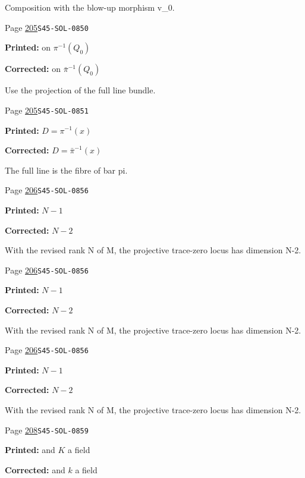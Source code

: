 \begin{description}
\par\noindent Composition with the blow-up morphism v\_0.
\smallskip
\item[\hypertarget{apparatus:EN-0145}{145}] Page \hyperlink{printpage:en:205}{205}\quad\texttt{S45-SOL-0850}
\par\noindent\textbf{Printed:} on $\pi^{-1}(Q_0)$
\par\noindent\textbf{Corrected:} on $\bar\pi^{-1}(Q_0)$
\par\noindent Use the projection of the full line bundle.
\smallskip
\item[\hypertarget{apparatus:EN-0146}{146}] Page \hyperlink{printpage:en:205}{205}\quad\texttt{S45-SOL-0851}
\par\noindent\textbf{Printed:} $D=\pi^{-1}(x)$
\par\noindent\textbf{Corrected:} $D=\bar\pi^{-1}(x)$
\par\noindent The full line is the fibre of bar pi.
\smallskip
\item[\hypertarget{apparatus:EN-0147}{147}] Page \hyperlink{printpage:en:206}{206}\quad\texttt{S45-SOL-0856}
\par\noindent\textbf{Printed:} \(N-1\)
\par\noindent\textbf{Corrected:} \(N-2\)
\par\noindent With the revised rank N of M, the projective trace-zero locus has dimension N-2.
\smallskip
\item[\hypertarget{apparatus:EN-0148}{148}] Page \hyperlink{printpage:en:206}{206}\quad\texttt{S45-SOL-0856}
\par\noindent\textbf{Printed:} \(N-1\)
\par\noindent\textbf{Corrected:} \(N-2\)
\par\noindent With the revised rank N of M, the projective trace-zero locus has dimension N-2.
\smallskip
\item[\hypertarget{apparatus:EN-0149}{149}] Page \hyperlink{printpage:en:206}{206}\quad\texttt{S45-SOL-0856}
\par\noindent\textbf{Printed:} \(N-1\)
\par\noindent\textbf{Corrected:} \(N-2\)
\par\noindent With the revised rank N of M, the projective trace-zero locus has dimension N-2.
\smallskip
\item[\hypertarget{apparatus:EN-0150}{150}] Page \hyperlink{printpage:en:208}{208}\quad\texttt{S45-SOL-0859}
\par\noindent\textbf{Printed:} and $K$ a field
\par\noindent\textbf{Corrected:} and $k$ a field

\end{description}
